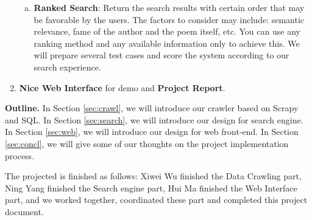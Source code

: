 \begin{enumerate}
\begin{enumerate}[a)]
          \item \textbf{Ranked Search}: Return the search results with certain order that may be favorable by the users. The factors to consider may include: semantic relevance, fame of the author and the poem itself, etc. You can use any ranking method and any available information only to achieve this. We will prepare several test cases and score the system according to our search experience.
        \end{enumerate}
  \item \textbf{Nice Web Interface} for demo and \textbf{Project Report}.
\end{enumerate}





\noindent \textbf{Outline.} In Section \ref{sec:crawl}, we will introduce our crawler based on Scrapy and SQL. In Section \ref{sec:search}, we will introduce our design for search engine. In Section \ref{sec:web}, we will introduce our design for web front-end. In Section \ref{sec:concl}, we will give some of our thoughts on the project implementation process.


The projected is finished as follows: Xiwei Wu finished the Data Crawling part, Ning Yang finished the Search engine part, Hui Ma finished the Web Interface part, and we worked together, coordinated these part and completed this project document.